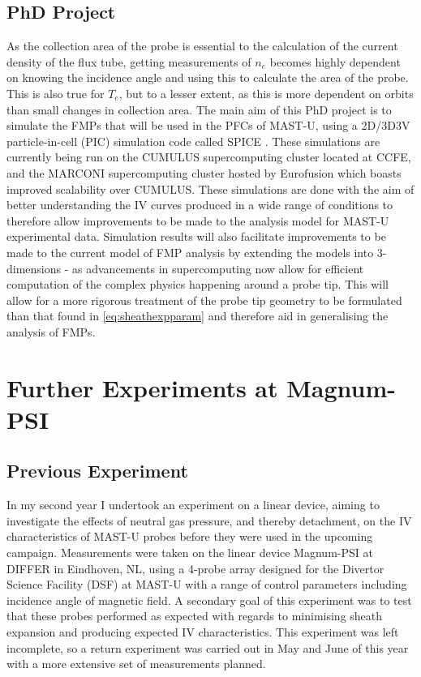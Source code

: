 \documentclass[a4paper, 12pt]{article} %
\begin{document}
\subsection{\label{subsec:motivation}PhD Project}
	As the collection area of the probe is essential to the calculation of the current density of the flux tube, getting measurements of $n_e$ becomes highly dependent on knowing the incidence angle and using this to calculate the area of the probe.
	This is also true for $T_e$, but to a lesser extent, as this is more dependent on orbits than small changes in collection area. 
	The main aim of this PhD project is to simulate the FMPs that will be used in the PFCs of MAST-U, using a 2D/3D3V particle-in-cell (PIC) simulation code called SPICE \cite{Komm2011, Komm2013}. 
	These simulations are currently being run on the CUMULUS supercomputing cluster located at CCFE, and the MARCONI supercomputing cluster hosted by Eurofusion\cite{Voitsekhovitch2018} which boasts  improved scalability over CUMULUS.
	These simulations are done with the aim of better understanding the IV curves produced in a wide range of conditions to therefore allow improvements to be made to the analysis model for MAST-U experimental data.
	Simulation results will also facilitate improvements to be made to the current model of FMP analysis by extending the models into 3-dimensions - as advancements in supercomputing now allow for efficient computation of the complex physics happening around a probe tip.
	This will allow for a more rigorous treatment of the probe tip geometry to be formulated than that found in \cref{eq:sheathexpparam} and therefore aid in generalising the analysis of FMPs.

	

\section{\label{sec:mag}Further Experiments at Magnum-PSI}
\subsection{\label{ssec:mag-prev}Previous Experiment}
    In my second year I undertook an experiment on a linear device, aiming to investigate the effects of neutral gas pressure, and thereby detachment, on the IV characteristics of MAST-U probes before they were used in the upcoming campaign.
    Measurements were taken on the linear device Magnum-PSI at DIFFER in Eindhoven, NL, using a 4-probe array designed for the Divertor Science Facility (DSF) at MAST-U \cite{Elmore2012} with a range of control parameters including incidence angle of magnetic field. 
	A secondary goal of this experiment was to test that these probes performed as expected with regards to minimising sheath expansion and producing expected IV characteristics.
    This experiment was left incomplete, so a return experiment was carried out in May and June of this year with a more extensive set of measurements planned. 
    
\end{document}
